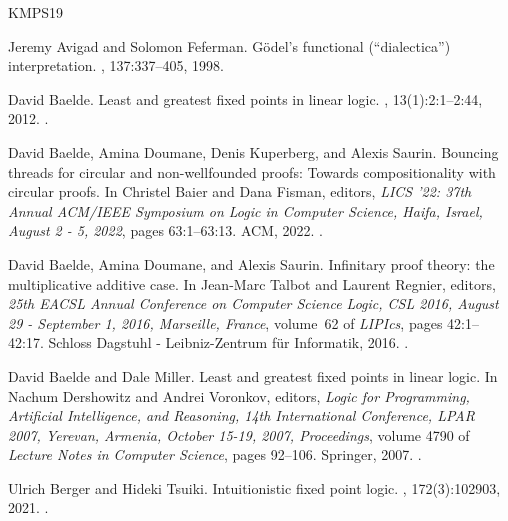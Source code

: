 \documentclass[10pt,a4paper]{amsart}
\theoremstyle{plain}
\theoremstyle{definition}
\theoremstyle{plain}
\theoremstyle{definition} %
\begin{document}
       

\begin{thebibliography}{KMPS19}

Jeremy Avigad and Solomon Feferman.
\newblock G{\"o}del’s functional (“dialectica”) interpretation.
, 137:337--405, 1998.

David Baelde.
\newblock Least and greatest fixed points in linear logic.
, 13(1):2:1--2:44, 2012.
\newblock \href {https://doi.org/10.1145/2071368.2071370} {}.

David Baelde, Amina Doumane, Denis Kuperberg, and Alexis Saurin.
\newblock Bouncing threads for circular and non-wellfounded proofs: Towards compositionality with circular proofs.
\newblock In Christel Baier and Dana Fisman, editors, {\em {LICS} '22: 37th Annual {ACM/IEEE} Symposium on Logic in Computer Science, Haifa, Israel, August 2 - 5, 2022}, pages 63:1--63:13. {ACM}, 2022.
\newblock \href {https://doi.org/10.1145/3531130.3533375} {}.

David Baelde, Amina Doumane, and Alexis Saurin.
\newblock Infinitary proof theory: the multiplicative additive case.
\newblock In Jean{-}Marc Talbot and Laurent Regnier, editors, {\em 25th {EACSL} Annual Conference on Computer Science Logic, {CSL} 2016, August 29 - September 1, 2016, Marseille, France}, volume~62 of {\em LIPIcs}, pages 42:1--42:17. Schloss Dagstuhl - Leibniz-Zentrum f{\"{u}}r Informatik, 2016.
\newblock \href {https://doi.org/10.4230/LIPIcs.CSL.2016.42} {}.

David Baelde and Dale Miller.
\newblock Least and greatest fixed points in linear logic.
\newblock In Nachum Dershowitz and Andrei Voronkov, editors, {\em Logic for Programming, Artificial Intelligence, and Reasoning, 14th International Conference, {LPAR} 2007, Yerevan, Armenia, October 15-19, 2007, Proceedings}, volume 4790 of {\em Lecture Notes in Computer Science}, pages 92--106. Springer, 2007.
\newblock \href {https://doi.org/10.1007/978-3-540-75560-9\_9} {}.

Ulrich Berger and Hideki Tsuiki.
\newblock Intuitionistic fixed point logic.
, 172(3):102903, 2021.
\newblock \href {https://doi.org/10.1016/j.apal.2020.102903} {}.


\end{thebibliography}
\end{document}
